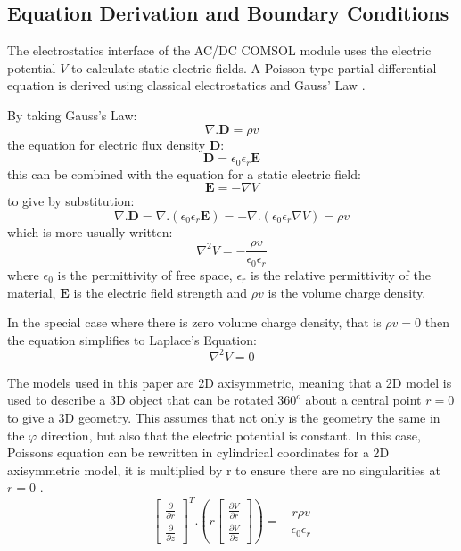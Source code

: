 \subsection{Equation Derivation and Boundary Conditions}
The electrostatics interface of the AC/DC COMSOL module uses the electric potential $V$ to calculate static electric fields.
A Poisson type partial differential equation is derived using classical electrostatics and Gauss' Law \cite{hayt2012engineering}.

By taking Gauss's Law:
\begin{equation}
\nabla.\mathbf{D} = \rho v
\end{equation}
the equation for electric flux density $\mathbf{D}$:
\begin{equation}
\mathbf{D} = \epsilon_0\epsilon_r\mathbf{E}
\end{equation}
this can be combined with the equation for a static electric field:
\begin{equation}
\mathbf{E} = -\nabla V
\end{equation}
to give by substitution:
\begin{equation}
\nabla.\mathbf{D} = \nabla.(\epsilon_0 \epsilon_r \mathbf{E}) = -\nabla.(\epsilon_0 \epsilon_r \nabla V) = \rho v
\end{equation}
which is more usually written:
\begin{equation}
\nabla^{2}V = -\frac{\rho v}{\epsilon_0 \epsilon_r}
\end{equation}
where $\epsilon_0$ is the permittivity of free space, $\epsilon_r$ is the relative permittivity of the material, $\mathbf{E}$ is the electric field strength and $\rho v$ is the volume charge density.

In the special case where there is zero volume charge density, that is $\rho v = 0$ then the equation simplifies to Laplace's Equation:
\begin{equation}
\nabla^{2}V = 0
\end{equation}

The models used in this paper are 2D axisymmetric, meaning that a 2D model is used to describe a 3D object that can be rotated $360^o$ about a central point $r=0$ to give a 3D geometry.
This assumes that not only is the geometry the same in the $\varphi$ direction, but also that the electric potential is constant.
In this case, Poissons equation can be rewritten in cylindrical coordinates for a 2D axisymmetric model, it is multiplied by r to ensure there are no singularities at $r=0$ \cite{meshkatoddini2006study}.
\begin{equation}
\begin{bmatrix} 
\frac{\partial}{\partial r} \\
\frac{\partial}{\partial z}
\end{bmatrix}^T
.(r \begin{bmatrix}
\frac{\partial V}{\partial r} \\
\frac{\partial V}{\partial z}
\end{bmatrix})
= -\frac{r\rho v}{\epsilon_0 \epsilon_r}
\end{equation}

